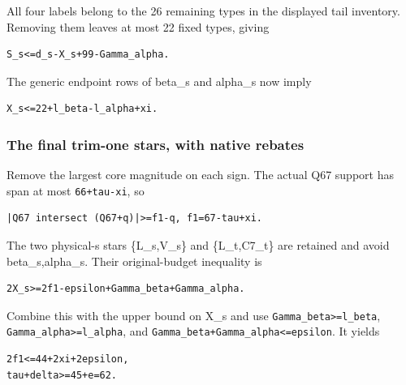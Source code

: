 \documentclass[10pt,a4paper]{article}
\theoremstyle{definition}
\begin{document}
All four labels belong to the 26 remaining types in the displayed tail
inventory. Removing them leaves at most 22 fixed types,\allowbreak{} giving

\begin{lstlisting}
S_s<=d_s-X_s+99-Gamma_alpha.
\end{lstlisting}

The generic endpoint rows of beta\_\allowbreak{}s and alpha\_\allowbreak{}s now imply

\begin{lstlisting}
X_s<=22+l_beta-l_alpha+xi.
\end{lstlisting}

\hypertarget{the-final-trim-one-stars-with-native-rebates}{%
\subsubsection{The final trim-one stars,\allowbreak{} with native
rebates}\label{the-final-trim-one-stars-with-native-rebates}}

Remove the largest core magnitude on each sign. The actual Q67 support
has span at most \texttt{66+\allowbreak{}tau-xi},\allowbreak{} so

\begin{lstlisting}
|Q67 intersect (Q67+q)|>=f1-q, f1=67-tau+xi.
\end{lstlisting}

The two physical-s stars \{L\_\allowbreak{}s,\allowbreak{}V\_\allowbreak{}s\} and \{L\_\allowbreak{}t,\allowbreak{}C7\_\allowbreak{}t\} are retained
and avoid beta\_\allowbreak{}s,\allowbreak{}alpha\_\allowbreak{}s. Their original-budget inequality is

\begin{lstlisting}
2X_s>=2f1-epsilon+Gamma_beta+Gamma_alpha.
\end{lstlisting}

Combine this with the upper bound on X\_\allowbreak{}s and use
\texttt{Gamma\_\allowbreak{}\allowbreak{}beta>=\allowbreak{}l\_\allowbreak{}\allowbreak{}beta},\allowbreak{}
\texttt{Gamma\_\allowbreak{}\allowbreak{}alpha>=\allowbreak{}l\_\allowbreak{}\allowbreak{}alpha},\allowbreak{} and
\texttt{Gamma\_\allowbreak{}\allowbreak{}beta+\allowbreak{}Gamma\_\allowbreak{}\allowbreak{}alpha<=\allowbreak{}epsilon}. It yields

\begin{lstlisting}
2f1<=44+2xi+2epsilon,
tau+delta>=45+e=62.
\end{lstlisting}
\end{document}
